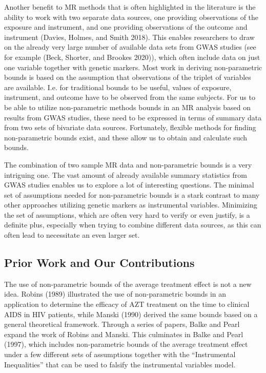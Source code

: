 \documentclass[
]{article}
\theoremstyle{plain}
\begin{document}
Another benefit to MR methods that is often highlighted in the literature is the ability to work with two separate data sources, one providing observations of the exposure and instrument, and one providing observations of the outcome and instrument (Davies, Holmes, and Smith 2018). This enables researchers to draw on the already very large number of available data sets from GWAS studies (see for example (Beck, Shorter, and Brookes 2020)), which often include data on just one variable together with genetic markers. Most work in deriving non-parametric bounds is based on the assumption that observations of the triplet of variables are available. I.e. for traditional bounds to be useful, values of exposure, instrument, and outcome have to be observed from the same subjects. For us to be able to utilize non-parametric methods bounds in an MR analysis based on results from GWAS studies, these need to be expressed in terms of summary data from two sets of bivariate data sources. Fortunately, flexible methods for finding non-parametric bounds exist, and these allow us to obtain and calculate such bounds.

The combination of two sample MR data and non-parametric bounds is a very intriguing one. The vast amount of already available summary statistics from GWAS studies enables us to explore a lot of interesting questions. The minimal set of assumptions needed for non-parametric bounds is a stark contrast to many other approaches utilizing genetic markers as instrumental variables. Minimizing the set of assumptions, which are often very hard to verify or even justify, is a definite plus, especially when trying to combine different data sources, as this can often lead to necessitate an even larger set.

\hypertarget{prior-work-and-our-contributions}{%
\subsection{Prior Work and Our Contributions}\label{prior-work-and-our-contributions}}

The use of non-parametric bounds of the average treatment effect is not a new idea. Robins (1989) illustrated the use of non-parametric bounds in an application to determine the efficacy of AZT treatment on the time to clinical AIDS in HIV patients, while Manski (1990) derived the same bounds based on a general theoretical framework. Through a series of papers, Balke and Pearl expand the work of Robins and Manski. This culminates in Balke and Pearl (1997), which includes non-parametric bounds of the average treatment effect under a few different sets of assumptions together with the ``Instrumental Inequalities'' that can be used to falsify the instrumental variables model.
\end{document}
